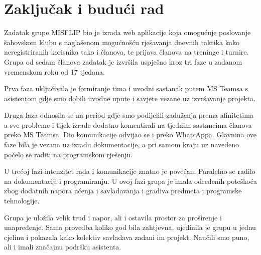 \chapter{Zaključak i budući rad}
		
	\noindent	Zadatak grupe MISFLIP bio je izrada web aplikacije koja omogućuje poslovanje šahovskom klubu s naglašenom mogućnošću rješavanja dnevnih taktika kako neregistriranih korisnika tako i članova, te prijava članova na treninge i turnire. Grupa od sedam članova zadatak je izvršila uspješno kroz tri faze u zadanom vremenskom roku od 17 tjedana.
		
	\noindent	Prva faza uključivala je formiranje tima i uvodni sastanak putem MS Teamsa s asistentom gdje smo dobili uvodne upute i savjete vezane uz izvršavanje projekta.
		
	\noindent	Druga faza odnosila se na period gdje smo podijelili zaduženja prema afinitetima a sve probleme i tijek izrade dodatno komentirali na tjednim sastancima članova preko MS Teamsa. Dio komunikacije odvijao se i preko WhatsAppa. Glavnina ove faze bila je vezana uz izradu dokumentacije, a pri samom kraju uz navedeno počelo se raditi na programskom rješenju.
		
	\noindent	U trećoj fazi intenzitet rada i komunikacije znatno je povećan. Paralelno se radilo na dokumentaciji i programiranju. U ovoj fazi grupa je imala određenih poteškoća zbog dodatnih napora učenja i savladavanja i gradiva predmeta i programske tehnologije.
		
	\noindent	Grupa je uložila velik trud i napor, ali i ostavila prostor za proširenje i unapređenje. Sama provedba koliko god bila zahtjevna, ujedinila je grupu u jednu cjelinu i pokazala kako kolektiv savladava zadani im projekt. Naučili smo puno, ali i imali značajnu podršku asistenta.
		
		
		\eject 